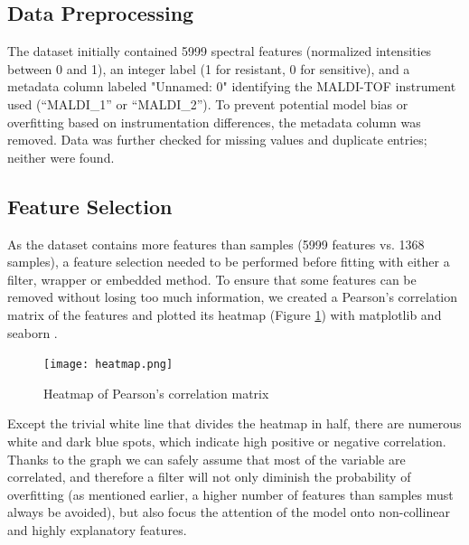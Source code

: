 \documentclass{article}
\begin{document}
\subsection{Data Preprocessing}
The dataset initially contained 5999 spectral features (normalized intensities between 0 and 1), an integer label (1 for resistant, 0 for sensitive), and a metadata column labeled "Unnamed: 0" identifying the MALDI-TOF instrument used (“MALDI\_1” or “MALDI\_2”). To prevent potential model bias or overfitting based on instrumentation differences, the metadata column was removed. Data was further checked for missing values and duplicate entries; neither were found.

\subsection{Feature Selection}
As the dataset contains more features than samples (5999 features vs. 1368 samples), a feature
selection needed to be performed before fitting with either a filter, wrapper or embedded method. To ensure
that some features can be removed without losing too much information, we created a Pearson’s correlation matrix of the features and plotted its heatmap (Figure \ref{fig:Heatmap of Pearson's correlation matrix}) with matplotlib \citep{matplotlib} and seaborn \citep{seaborn}.\\

\begin{figure}
	\centering
	\texttt{[image: heatmap.png]}
	 \vspace{-3em}
	\caption{Heatmap of Pearson's correlation matrix}
    \label{fig:Heatmap of Pearson's correlation matrix}
\end{figure}

Except the trivial white line that divides the heatmap in half, there are numerous white and dark blue spots, which indicate high positive or negative correlation. Thanks to the graph we can safely assume that most of the variable are correlated, and therefore a filter will not only diminish the probability of overfitting (as mentioned earlier, a higher number of features than samples must always be avoided), but also focus the attention of the model onto non-collinear and highly explanatory features. 
\end{document}
